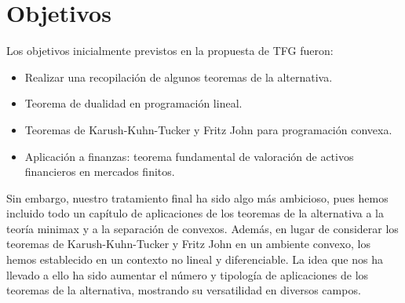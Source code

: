 \chapter{Objetivos}
Los objetivos inicialmente previstos en la propuesta de TFG fueron:
\begin{itemize}
\item Realizar una recopilación de algunos teoremas de la alternativa.
\item Teorema de dualidad en programación lineal.
\item Teoremas de Karush-Kuhn-Tucker y Fritz John para programación convexa.
\item Aplicación a finanzas: teorema fundamental de valoración de activos financieros en mercados finitos.
\end{itemize}

Sin embargo, nuestro tratamiento final ha sido algo más ambicioso, pues hemos incluido todo un capítulo de aplicaciones de los teoremas de la alternativa a la teoría minimax y a la separación de convexos. Además, en lugar de considerar los teoremas de Karush-Kuhn-Tucker y Fritz John en un ambiente convexo, los hemos establecido en un contexto no lineal y diferenciable. La idea que nos ha llevado a ello ha sido aumentar el número y tipología de aplicaciones de los teoremas de la alternativa, mostrando su versatilidad en diversos campos.